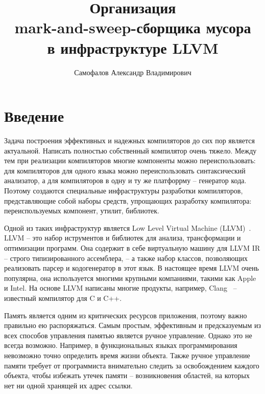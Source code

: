 \title{Организация\\
mark-and-sweep-сборщика мусора\\
в инфраструктуре LLVM}
%
\author{Самофалов Александр Владимирович}
%
%

%
%

\maketitle              %

\begin{abstract}
\end{abstract}
%

\section*{Введение}
Задача построения эффективных и надежных компиляторов до сих пор является актуальной. Написать полностью собственный компилятор очень тяжело. Между тем при реализации компиляторов многие компоненты можно переиспользовать: для компиляторов для одного языка можно переиспользовать синтаксический анализатор, а для компиляторов в одну и ту же платфоррму -- генератор кода. Поэтому создаются специальные инфраструктуры разработки компиляторов, представляющие собой наборы средств, упрощающих разработку компилятора: переиспользуемых компонент, утилит, библиотек.

Одной из таких инфраструктур является Low Level Virtual Machine (LLVM)~\cite{llvm}. LLVM -- это набор иструментов и библиотек для анализа, трансформации и оптимизации программ. Она содержит в себе виртуальную машину для LLVM IR -- строго типизированного ассемблера, -- а также набор классов, позволяющих реализовать парсер и кодогенератор в этот язык. В настоящее время LLVM очень популярна, она используется многими крупными компаниями, такими как Apple и Intel. На основе LLVM написаны многие продукты, например, Clang~\cite{clang} -- известный компилятор для C и C++.

Память является одним из критических ресурсов приложения, поэтому важно правильно ею распоряжаться. 
Самым простым, эффективным и предсказуемым из всех способов управления памятью является ручное управление. 
Однако это не всегда возможно. Например, в функциональных языках программирования невозможно точно
определить время жизни объекта. Также ручное управление памяти требует от программиста внимательно следить
за освобождением каждого объекта, чтобы избежать утечек памяти -- возникновения областей, на которых нет ни одной 
хранящей их адрес ссылки.

